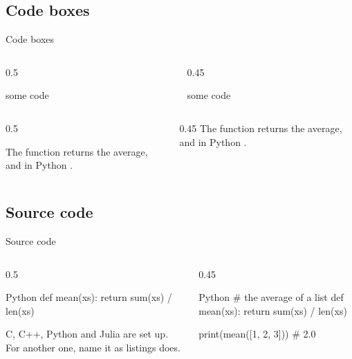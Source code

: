 \subsection{Code boxes}
\begin{frame}{Code boxes}
\begin{columns}[T,onlytextwidth]
\begin{column}{0.5\textwidth}
\begin{codedoc}
\begin{codeonly}
  \alert{some code}
\end{codeonly}
\end{codedoc}
\end{column}
\begin{column}{0.45\textwidth}
\stepoffset
\begin{codeonly}
\alert{some code}
\end{codeonly}
\end{column}
\end{columns}
\bigskip
\begin{columns}[T,onlytextwidth]
\begin{column}{0.5\textwidth}
\begin{codedoc}
The function  returns
the average, and in Python
.
\end{codedoc}
\end{column}
\begin{column}{0.45\textwidth}
\stepoffset
The function  returns the average, and in Python .
\end{column}
\end{columns}
\end{frame}

\subsection{Source code}
\begin{frame}{Source code}
\begin{columns}[T,onlytextwidth]
\begin{column}{0.5\textwidth}
\begin{codedoc}
\begin{codeblock}{Python}
  def mean(xs):
      return sum(xs) / len(xs)
\end{codeblock}
\end{codedoc}
\smallskip
{}
C, C++, Python and Julia are set up. For another one, name it as listings does.
\end{column}
\begin{column}{0.45\textwidth}
\stepoffset
\begin{codeblock}{Python}
# the average of a list
def mean(xs):
    return sum(xs) / len(xs)

print(mean([1, 2, 3]))  # 2.0
\end{codeblock}
\end{column}
\end{columns}
\end{frame}

